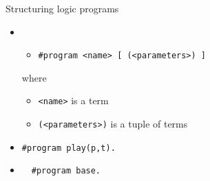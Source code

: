 \begin{frame}{Structuring logic programs}
  \begin{itemize}
  \item {}
    \medskip
    \begin{itemize}
    \item [] \texttt{\#program <name> [ (<parameters>) ]}
    \end{itemize}
    \medskip
    where
    \begin{itemize}
    \item \texttt{<name>} is a term
    \item \texttt{(<parameters>)} is a tuple of terms
    \end{itemize}
    \bigskip
  \item<2->  \texttt{\#program play(p,t).}
    \smallskip
  \item<3-> \,  \ \texttt{\#program base.}
  \end{itemize}
\end{frame}
%
